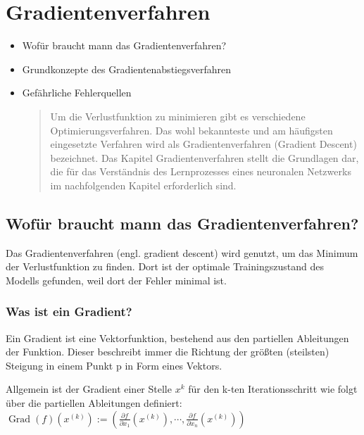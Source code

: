 \newpage
\thispagestyle{empty}
\section{Gradientenverfahren}\label{sec:gradientenverfahren}   
\begin{tcolorbox}[title={Inhalte des \textit{Gradientenverfahren}}]
  \begin{itemize}
    \item Wofür braucht mann das Gradientenverfahren?
    \item Grundkonzepte des Gradientenabstiegsverfahren
    \item Gefährliche Fehlerquellen
  \begin{quotation}\noindent
    Um die Verlustfunktion zu minimieren gibt es verschiedene Optimierungsverfahren. Das wohl bekannteste und am häufigsten eingesetzte Verfahren wird als Gradientenverfahren (Gradient Descent) bezeichnet.
    Das Kapitel Gradientenverfahren stellt die Grundlagen dar, die für das Verständnis des Lernprozesses eines neuronalen Netzwerks im nachfolgenden Kapitel erforderlich sind.
  \end{quotation}
  \end{itemize}
\end{tcolorbox}


\subsection{Wofür braucht mann das Gradientenverfahren?}\label{subsec:gradientenverfahren:wofuer}
Das Gradientenverfahren (engl. gradient descent) wird genutzt, um das Minimum der Verlustfunktion zu finden. Dort ist der optimale Trainingszustand des Modells gefunden, weil dort der Fehler minimal ist.


\subsubsection{Was ist ein Gradient?}\label{subsec:gradientenverfahren:was_ist_gradient}
  Ein Gradient ist eine Vektorfunktion, bestehend aus den partiellen Ableitungen der Funktion.
  Dieser beschreibt immer die Richtung der größten (steilsten) Steigung in einem Punkt p in Form eines Vektors.\cite{LH21}

  Allgemein ist der Gradient einer Stelle $x^k$ für den k-ten Iterationsschritt wie folgt über die partiellen Ableitungen definiert:
  $\operatorname{Grad}(f)(x^{(k)}) := \left(\frac{\partial f}{\partial x_{1}}(x^{(k)}), \cdots, \frac{\partial f}{\partial x_{n}}(x^{(k)})\right)$


